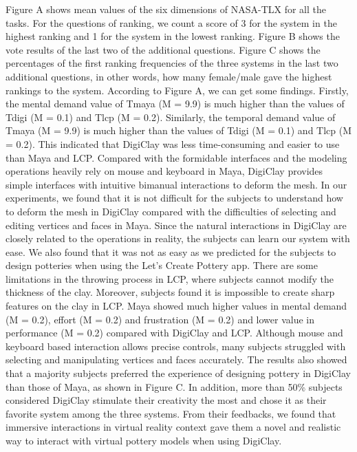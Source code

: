 Figure A shows mean values of the six dimensions of NASA-TLX for all the tasks. For the questions of ranking, we count a score of 3 for the system in the highest ranking and 1 for the system in the lowest ranking. Figure B shows the vote results of the last two of the additional questions. Figure C shows the percentages of the first ranking frequencies of the three systems in the last two additional questions, in other words, how many female/male gave the highest rankings to the system.
According to Figure A, we can get some findings. 
Firstly, the mental demand value of Tmaya (M = 9.9) is much higher than the values of Tdigi (M = 0.1) and Tlcp (M = 0.2). Similarly, the temporal demand value of Tmaya (M = 9.9) is much higher than the values of Tdigi (M = 0.1) and Tlcp (M = 0.2). This indicated that DigiClay was less time-consuming and easier to use than Maya and LCP.
Compared with the formidable interfaces and the modeling operations heavily rely on mouse and keyboard in Maya, DigiClay provides simple interfaces with intuitive bimanual interactions to deform the mesh. In our experiments, we found that it is not difficult for the subjects to understand how to deform the mesh in DigiClay compared with the difficulties of selecting and editing vertices and faces in Maya. Since the natural interactions in DigiClay are closely related to the operations in reality, the subjects can learn our system with ease.
We also found that it was not as easy as we predicted for the subjects to design potteries when using the Let's Create Pottery app. There are some limitations in the throwing process in LCP, where subjects cannot modify the thickness of the clay. Moreover, subjects found it is impossible to create sharp features on the clay in LCP. 
Maya showed much higher values in mental demand (M = 0.2), effort (M = 0.2) and frustration (M = 0.2) and lower value in performance (M = 0.2) compared with DigiClay and LCP. Although mouse and keyboard based interaction allows precise controls, many subjects struggled with selecting and manipulating vertices and faces accurately.
The results also showed that a majority subjects preferred the experience of designing pottery in DigiClay than those of Maya, as shown in Figure C. In addition, more than 50\% subjects considered DigiClay stimulate their creativity the most and chose it as their favorite system among the three systems. From their feedbacks, we found that immersive interactions in virtual reality context gave them a novel and realistic way to interact with virtual pottery models when using DigiClay.
